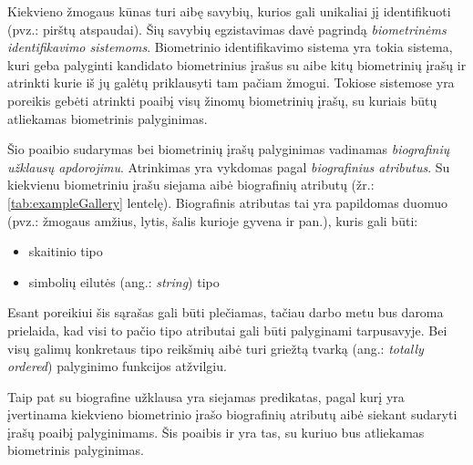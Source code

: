 

Kiekvieno žmogaus kūnas turi aibę savybių, kurios gali unikaliai jį identifikuoti (pvz.: pirštų atspaudai).
Šių savybių egzistavimas davė pagrindą {\it biometrinėms identifikavimo sistemoms}.
Biometrinio identifikavimo sistema yra tokia sistema, kuri geba palyginti kandidato biometrinius įrašus su aibe kitų biometrinių įrašų ir atrinkti kurie iš jų galėtų priklausyti tam pačiam žmogui.
Tokiose sistemose yra poreikis gebėti atrinkti poaibį visų žinomų biometrinių įrašų, su kuriais būtų atliekamas biometrinis palyginimas.

Šio poaibio sudarymas bei biometrinių įrašų palyginimas vadinamas {\it biografinių užklausų apdorojimu}.
Atrinkimas yra vykdomas pagal {\it biografinius atributus}.
Su kiekvienu biometriniu įrašu siejama aibė biografinių atributų (žr.: \ref{tab:exampleGallery} lentelę).
Biografinis atributas tai yra papildomas duomuo (pvz.: žmogaus amžius, lytis, šalis kurioje gyvena ir pan.), kuris gali būti:
\begin{itemize}
\item skaitinio tipo
\item simbolių eilutės (ang.: {\it string}) tipo
\end{itemize}

Esant poreikiui šis sąrašas gali būti plečiamas, tačiau darbo metu bus daroma prielaida, kad visi to pačio tipo atributai gali būti palyginami tarpusavyje.
Bei visų galimų konkretaus tipo reikšmių aibė turi griežtą tvarką (ang.: {\it totally ordered}) palyginimo funkcijos atžvilgiu.

Taip pat su biografine užklausa yra siejamas predikatas, pagal kurį yra įvertinama kiekvieno biometrinio įrašo biografinių atributų aibė siekant sudaryti įrašų poaibį palyginimams.
Šis poaibis ir yra tas, su kuriuo bus atliekamas biometrinis palyginimas.

